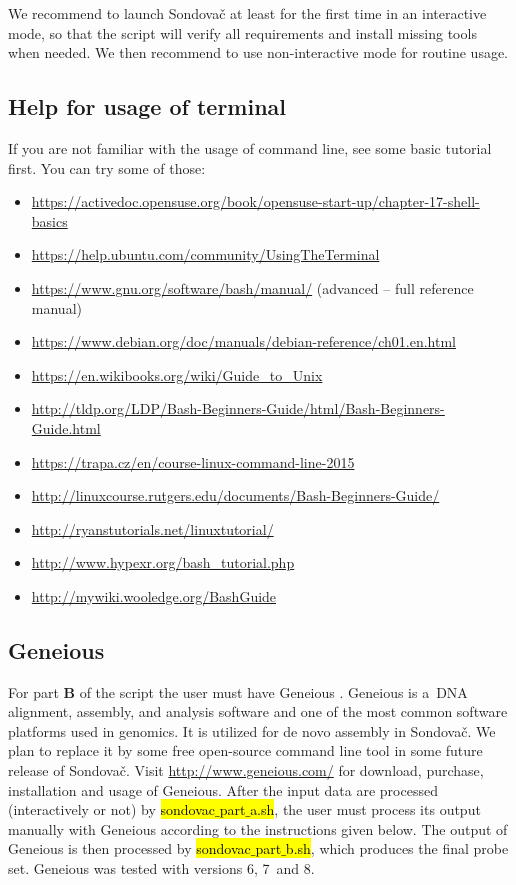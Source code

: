 \documentclass[a4paper, 11pt, twoside]{article}
\renewcommand{\texttt}[1]{\hl{\ttfamily #1}}
\begin{document}
We recommend to launch Sondovač at least for the first time in an interactive mode, so that the script will verify all requirements and install missing tools when needed. We then recommend to use non-interactive mode for routine usage.

\subsection{Help for usage of terminal}

If you are not familiar with the usage of command line, see some basic tutorial first. You can try some of those:

\begin{itemize}
  \item \url{https://activedoc.opensuse.org/book/opensuse-start-up/chapter-17-shell-basics}
  \item \url{https://help.ubuntu.com/community/UsingTheTerminal}
  \item \url{https://www.gnu.org/software/bash/manual/} (advanced -- full reference manual)
  \item \url{https://www.debian.org/doc/manuals/debian-reference/ch01.en.html}
  \item \url{https://en.wikibooks.org/wiki/Guide_to_Unix}
  \item \url{http://tldp.org/LDP/Bash-Beginners-Guide/html/Bash-Beginners-Guide.html}
  \item \url{https://trapa.cz/en/course-linux-command-line-2015}
  \item \url{http://linuxcourse.rutgers.edu/documents/Bash-Beginners-Guide/}
  \item \url{http://ryanstutorials.net/linuxtutorial/}
  \item \url{http://www.hypexr.org/bash_tutorial.php}
  \item \url{http://mywiki.wooledge.org/BashGuide}
\end{itemize}

\subsection{Geneious}
\label{geneious}

For part \textbf{B} of the script the user must have Geneious \citep{Kearse2012}. Geneious is a~DNA alignment, assembly, and analysis software and one of the most common software platforms used in genomics. It is utilized for de novo assembly in Sondovač. We plan to replace it by some free open-source command line tool in some future release of Sondovač. Visit \url{http://www.geneious.com/} for download, purchase, installation and usage of Geneious. After the input data are processed (interactively or not) by \texttt{sondovac$\_$part$\_$a.sh}, the user must process its output manually with Geneious according to the instructions given below. The output of Geneious is then processed by \texttt{sondovac$\_$part$\_$b.sh}, which produces the final probe set. Geneious was tested with versions 6, 7~and 8.
\end{document}
